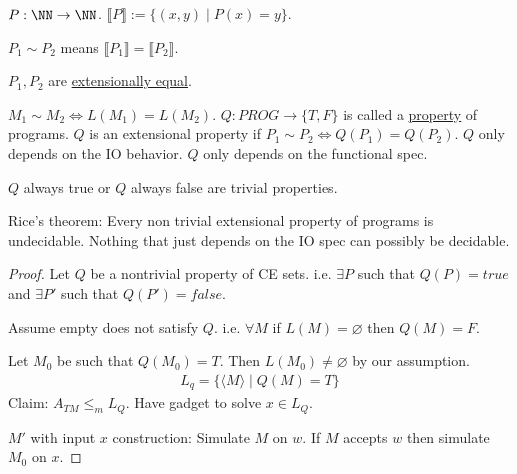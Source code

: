 \documentclass[../598comp.tex]{subfiles}
\begin{document}
\begin{theorem}
  $P: \NN \to \NN$. $\llbracket P \rrbracket := \{(x, y) \mid P(x) = y\}$.

  $P_1 \sim P_2$ means $\llbracket P_1 \rrbracket = \llbracket P_2 \rrbracket$.

  $P_1, P_2$ are \ul{extensionally equal}.

  $M_1 \sim M_2 \iff L(M_1) = L(M_2)$. $Q: PROG \to \{T, F\}$ is called a
  \ul{property} of programs. $Q$ is an extensional property if $P_1 \sim P_2
  \iff Q(P_1) = Q(P_2)$. $Q$ only depends on the IO behavior. $Q$ only depends
  on the functional spec.

  $Q$ always true or $Q$ always false are trivial properties.

  Rice's theorem: Every non trivial extensional property of programs is
  undecidable. Nothing that just depends on the IO spec can possibly be decidable.
  \begin{proof}
    Let $Q$ be a nontrivial property of CE sets. i.e. $\exists P$ such that
    $Q(P) = true$ and $\exists P'$ such that $Q(P')= false$.

    Assume empty does not satisfy $Q$. i.e. $\forall M$ if $L(M) = \varnothing$
    then $Q(M) = F$.

    Let $M_0$ be such that $Q(M_0) = T$. Then $L(M_0) \neq \varnothing$ by our assumption.
    \begin{gather*}
      L_q = \{\langle M \rangle \mid Q(M) = T\}
    \end{gather*}
    Claim: $A_{TM} \leq_m L_Q$. Have gadget to solve $x \in L_Q$.

    $M'$ with input $x$ construction: Simulate $M$ on $w$. If $M$ accepts $w$
    then simulate $M_0$ on $x$.
  \end{proof}
\end{theorem}
\end{document}
